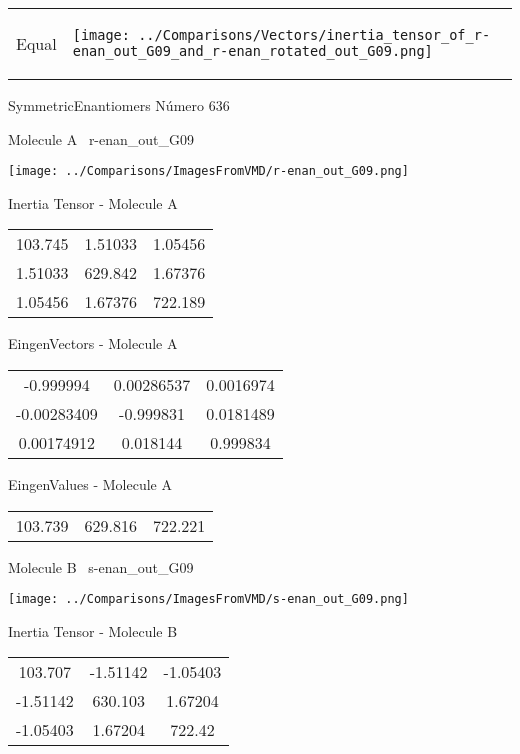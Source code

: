 \vtab[-5mm]
\begin{tabular}{*{2}{m{}}}
\begin{center}
\textcolor{NavyBlue}{\Large Equal}
\end{center}
&
\begin{center}
\texttt{[image: ../Comparisons/Vectors/inertia\_tensor\_of\_r-enan\_out\_G09\_and\_r-enan\_rotated\_out\_G09.png]}
\end{center}
\end{tabular}

 \newpage

\vtab[-3cm]
\begin{center}
{\large SymmetricEnantiomers \tab Número 636}
\end{center}
\begin{multicols}{2}
\begin{center}

Molecule A \
r-enan\_out\_G09

\texttt{[image: ../Comparisons/ImagesFromVMD/r-enan\_out\_G09.png]}

Inertia Tensor - Molecule A \\
\begin{tabular}{|c c c|}
103.745	 & 	1.51033	 & 	1.05456	 \\
1.51033	 & 	629.842	 & 	1.67376	 \\
1.05456	 & 	1.67376	 & 	722.189
\end{tabular}

\vtab
 EingenVectors - Molecule A     \\
\begin{tabular}{|c c c|}
-0.999994	 & 	0.00286537	 & 	0.0016974	 \\
-0.00283409	 & 	-0.999831	 & 	0.0181489	 \\
0.00174912	 & 	0.018144	 & 	0.999834
\end{tabular}

\vtab
 EingenValues - Molecule A     \\
\begin{tabular}{|c c c|}
103.739	 & 	629.816	 & 	722.221	 \\
\end{tabular}
\columnbreak

Molecule B \
s-enan\_out\_G09

\texttt{[image: ../Comparisons/ImagesFromVMD/s-enan\_out\_G09.png]}

Inertia Tensor - Molecule B \\
\begin{tabular}{|c c c|}
103.707	 & 	-1.51142	 & 	-1.05403	 \\
-1.51142	 & 	630.103	 & 	1.67204	 \\
-1.05403	 & 	1.67204	 & 	722.42
\end{tabular}


\end{center}
\end{multicols}
